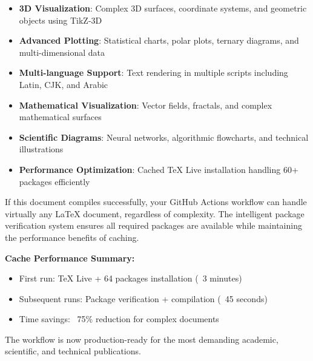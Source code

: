 \documentclass[12pt,a4paper,twoside]{article}
\theoremstyle{definition}
\begin{document}
\begin{itemize}
\item \textbf{3D Visualization}: Complex 3D surfaces, coordinate systems, and geometric objects using TikZ-3D
\item \textbf{Advanced Plotting}: Statistical charts, polar plots, ternary diagrams, and multi-dimensional data
\item \textbf{Multi-language Support}: Text rendering in multiple scripts including Latin, CJK, and Arabic
\item \textbf{Mathematical Visualization}: Vector fields, fractals, and complex mathematical surfaces
\item \textbf{Scientific Diagrams}: Neural networks, algorithmic flowcharts, and technical illustrations
\item \textbf{Performance Optimization}: Cached TeX Live installation handling 60+ packages efficiently
\end{itemize}

If this document compiles successfully, your GitHub Actions workflow can handle virtually any LaTeX document, regardless of complexity. The intelligent package verification system ensures all required packages are available while maintaining the performance benefits of caching.

\textbf{Cache Performance Summary:}
\begin{itemize}
\item First run: TeX Live + 64 packages installation (~3 minutes)
\item Subsequent runs: Package verification + compilation (~45 seconds)
\item Time savings: ~75\% reduction for complex documents
\end{itemize}

The workflow is now production-ready for the most demanding academic, scientific, and technical publications.
\end{document}
